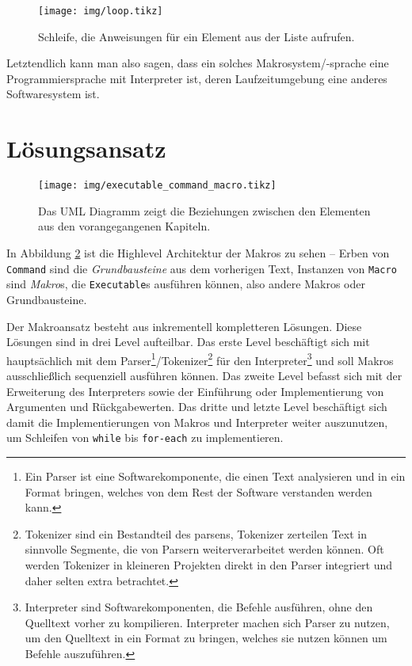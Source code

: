  \begin{figure}[H]
    \centering
    \texttt{[image: img/loop.tikz]}
    \caption{Schleife, die Anweisungen für ein Element aus der Liste aufrufen.}
    \label{fig:loop}
  \end{figure}

  Letztendlich kann man also sagen, dass ein solches Makrosystem/-sprache eine Programmiersprache mit Interpreter\autocite[S.263]{Gamma:1995:DPE:186897} ist, deren Laufzeitumgebung eine anderes Softwaresystem ist.

\section{Lösungsansatz}
\label{sec:loesungsansatz}
 \begin{figure}[H]
    \centering
    \texttt{[image: img/executable\_command\_macro.tikz]}
    \caption{Das UML Diagramm zeigt die Beziehungen zwischen den Elementen aus den vorangegangenen Kapiteln.}
    \label{fig:executable_command_macro}
  \end{figure}
  In Abbildung \ref{fig:executable_command_macro} ist die Highlevel Architektur der Makros zu sehen -- Erben von \texttt{Command} sind die \textit{Grundbausteine} aus dem vorherigen Text, Instanzen von \texttt{Macro} sind \textit{Makro}s, die \texttt{Executable}s ausführen können, also andere Makros oder Grundbausteine.

  Der Makroansatz besteht aus inkrementell kompletteren Lösungen. Diese Lösungen sind in drei Level aufteilbar. Das erste Level beschäftigt sich mit hauptsächlich mit dem Parser\footnote{%
    Ein Parser ist eine Softwarekomponente, die einen Text analysieren und in ein Format bringen, welches von dem Rest der Software verstanden werden kann.
  }/Tokenizer\footnote{%
    Tokenizer sind ein Bestandteil des parsens, Tokenizer zerteilen Text in sinnvolle Segmente, die von Parsern weiterverarbeitet werden können. Oft werden Tokenizer in kleineren Projekten direkt in den Parser integriert und daher selten extra betrachtet.
  } für den Interpreter\footnote{%
    Interpreter sind Softwarekomponenten, die Befehle ausführen, ohne den Quelltext vorher zu kompilieren. Interpreter machen sich Parser zu nutzen, um den Quelltext in ein Format zu bringen, welches sie nutzen können um Befehle auszuführen.
  } und soll Makros ausschließlich sequenziell ausführen können. Das zweite Level befasst sich mit der Erweiterung des Interpreters sowie der Einführung oder Implementierung von Argumenten und Rückgabewerten. Das dritte und letzte Level beschäftigt sich damit die Implementierungen von Makros und Interpreter weiter auszunutzen, um Schleifen von \texttt{while} bis \texttt{for-each} zu implementieren.

